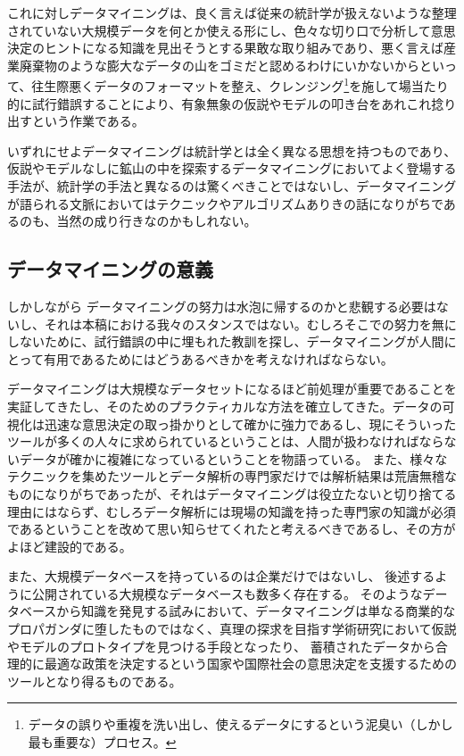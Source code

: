 これに対しデータマイニングは、良く言えば従来の統計学が扱えないような整理されていない大規模データを何とか使える形にし、色々な切り口で分析して意思決定のヒントになる知識を見出そうとする果敢な取り組みであり、悪く言えば産業廃棄物のような膨大なデータの山をゴミだと認めるわけにいかないからといって、往生際悪くデータのフォーマットを整え、クレンジング\footnote{データの誤りや重複を洗い出し、使えるデータにするという泥臭い（しかし最も重要な）プロセス。}を施して場当たり的に試行錯誤することにより、有象無象の仮説やモデルの叩き台をあれこれ捻り出すという作業である。

いずれにせよデータマイニングは統計学とは全く異なる思想を持つものであり、仮説やモデルなしに鉱山の中を探索するデータマイニングにおいてよく登場する手法が、統計学の手法と異なるのは驚くべきことではないし、データマイニングが語られる文脈においてはテクニックやアルゴリズムありきの話になりがちであるのも、当然の成り行きなのかもしれない。

\subsection{データマイニングの意義}
しかしながら
データマイニングの努力は水泡に帰するのかと悲観する必要はないし、それは本稿における我々のスタンスではない。むしろそこでの努力を無にしないために、試行錯誤の中に埋もれた教訓を探し、データマイニングが人間にとって有用であるためにはどうあるべきかを考えなければならない。

データマイニングは大規模なデータセットになるほど前処理が重要であることを実証してきたし、そのためのプラクティカルな方法を確立してきた。データの可視化は迅速な意思決定の取っ掛かりとして確かに強力であるし、現にそういったツールが多くの人々に求められているということは、人間が扱わなければならないデータが確かに複雑になっているということを物語っている。
また、様々なテクニックを集めたツールとデータ解析の専門家だけでは解析結果は荒唐無稽なものになりがちであったが、それはデータマイニングは役立たないと切り捨てる理由にはならず、むしろデータ解析には現場の知識を持った専門家の知識が必須であるということを改めて思い知らせてくれたと考えるべきであるし、その方がよほど建設的である。

また、大規模データベースを持っているのは企業だけではないし、
後述するように公開されている大規模なデータベースも数多く存在する。
そのようなデータベースから知識を発見する試みにおいて、データマイニングは単なる商業的なプロパガンダに堕したものではなく、真理の探求を目指す学術研究において仮説やモデルのプロトタイプを見つける手段となったり、
蓄積されたデータから合理的に最適な政策を決定するという国家や国際社会の意思決定を支援するためのツールとなり得るものである。

